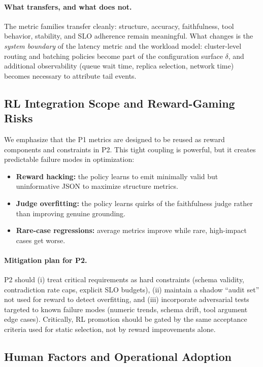 \paragraph{What transfers, and what does not.}
The metric families transfer cleanly: structure, accuracy, faithfulness, tool behavior, stability, and SLO adherence remain meaningful.
What changes is the \emph{system boundary} of the latency metric and the workload model: cluster-level routing and batching policies become part of the configuration surface $\delta$, and additional observability (queue wait time, replica selection, network time) becomes necessary to attribute tail events.

\subsection{RL Integration Scope and Reward-Gaming Risks}

We emphasize that the P1 metrics are designed to be reused as reward components and constraints in P2.
This tight coupling is powerful, but it creates predictable failure modes in optimization:

\begin{itemize}[leftmargin=12pt]
    \item \textbf{Reward hacking:} the policy learns to emit minimally valid but uninformative JSON to maximize structure metrics.
    \item \textbf{Judge overfitting:} the policy learns quirks of the faithfulness judge rather than improving genuine grounding.
    \item \textbf{Rare-case regressions:} average metrics improve while rare, high-impact cases get worse.
\end{itemize}

\paragraph{Mitigation plan for P2.}
P2 should (i) treat critical requirements as hard constraints (schema validity, contradiction rate caps, explicit SLO budgets), (ii) maintain a shadow ``audit set'' not used for reward to detect overfitting, and (iii) incorporate adversarial tests targeted to known failure modes (numeric trends, schema drift, tool argument edge cases).
Critically, RL promotion should be gated by the same acceptance criteria used for static selection, not by reward improvements alone.

\subsection{Human Factors and Operational Adoption}

